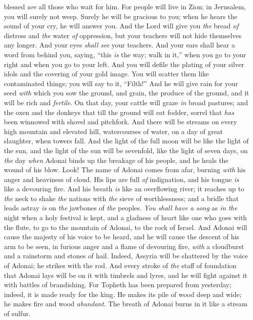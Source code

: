 \begin{biblechapter}
blessed \textit{are} all those who wait for him.
\verse For people will live in Zion; 
in Jerusalem, you will surely not weep. 
Surely he will be gracious to you; 
when he hears the sound of your cry, he will answer you.
\verse And the Lord will give you \textit{the} bread \textit{of} distress 
and \textit{the} water \textit{of} oppression, 
but your teachers will not hide themselves any longer. 
And your eyes \textit{shall see} your teachers.
\verse And your ears shall hear a word from behind you, saying, 
“this \textit{is} the way; walk in it,” 
when you go to your right 
and when you go to your left.
\verse And you will defile the plating of your silver idols 
and the covering of your gold image. 
You will scatter them like contaminated things; 
you will say to it, “Filth!”
\verse And he will give rain for your seed \textit{with} which you sow the ground, 
and grain, the produce of the ground, and it will be rich and \textit{fertile}. 
On that day, your cattle will graze \textit{in} broad pastures;
\verse and the oxen and the donkeys that till the ground will eat fodder, sorrel 
that \textit{has} been winnowed with shovel and pitchfork.
\verse And there will be streams on every high mountain and elevated hill, 
watercourses of water, on a day of great slaughter, when towers fall.
\verse And the light of the full moon will be like the light of the sun, 
and the light of the sun will be sevenfold, like the light of seven days, 
on \textit{the} day \textit{when} Adonai binds up the breakage of his people, 
and he heals the wound of his blow.
 Look! The name of Adonai comes from afar, 
burning \textit{with} his anger and heaviness of cloud. 
His lips are full \textit{of} indignation, 
and his tongue \textit{is} like a devouring fire.
\verse And his breath \textit{is} like an overflowing river; 
it reaches up to \textit{the} neck 
to shake \textit{the} nations with \textit{the} sieve of worthlessness; 
and a bridle that leads astray \textit{is} on \textit{the} jawbones of \textit{the} peoples.
\verse \textit{You shall have a song} as \textit{in} \textit{the} night when a holy festival is kept, 
and a gladness of heart like one who goes with the flute, 
to go to the mountain of Adonai, to the rock of Israel.
\verse And Adonai will cause the majesty of his voice to be heard, 
and he will cause the descent of his arm to be seen, 
in furious anger and a flame of devouring fire, 
\textit{with} a cloudburst and a rainstorm and stones of hail.
\verse Indeed, Assyria will be shattered by the voice of Adonai; 
he strikes with the rod.
\verse And every stroke of \textit{the} staff of foundation that Adonai lays will be on it with timbrels and lyres, 
and he will fight against it with battles of brandishing.
\verse For Topheth has been prepared from yesterday; 
indeed, it is made ready for the king. 
He makes its pile of wood deep and wide; 
he makes fire and wood \textit{abundant}. 
The breath of Adonai burns in it like a stream of sulfur.
\end{biblechapter}

